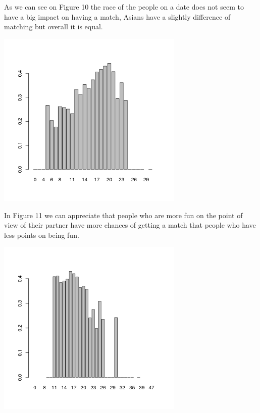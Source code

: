 As we can see on Figure 10 the race of the people on a date does not seem to have a big impact on having a match, Asians have a slightly difference of matching but overall it is equal.

\begin{center}
\includegraphics[width=3.5in]{images/Hist_Plots_Analysis/bivar_match_fun_o.png}
\label{fig:aLabelForReferencing}
\end{center}

In Figure 11 we can appreciate that people who are more fun on the point of view of their partner have more chances of getting a match that people who have less points on being fun.

\begin{center}
\includegraphics[width=3.5in]{images/Hist_Plots_Analysis/bivar_match_intel.png}
\label{fig:aLabelForReferencing}
\end{center}


